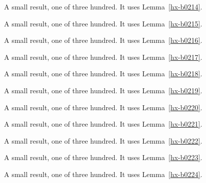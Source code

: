 \begin{lemma}[Bulk 215]\label{hx-b0215}
A small result, one of three hundred. It uses Lemma~\ref{hx-b0214}.
\end{lemma}

\begin{lemma}[Bulk 216]\label{hx-b0216}
A small result, one of three hundred. It uses Lemma~\ref{hx-b0215}.
\end{lemma}

\begin{lemma}[Bulk 217]\label{hx-b0217}
A small result, one of three hundred. It uses Lemma~\ref{hx-b0216}.
\end{lemma}

\begin{lemma}[Bulk 218]\label{hx-b0218}
A small result, one of three hundred. It uses Lemma~\ref{hx-b0217}.
\end{lemma}

\begin{lemma}[Bulk 219]\label{hx-b0219}
A small result, one of three hundred. It uses Lemma~\ref{hx-b0218}.
\end{lemma}

\begin{lemma}[Bulk 220]\label{hx-b0220}
A small result, one of three hundred. It uses Lemma~\ref{hx-b0219}.
\end{lemma}

\begin{lemma}[Bulk 221]\label{hx-b0221}
A small result, one of three hundred. It uses Lemma~\ref{hx-b0220}.
\end{lemma}

\begin{lemma}[Bulk 222]\label{hx-b0222}
A small result, one of three hundred. It uses Lemma~\ref{hx-b0221}.
\end{lemma}

\begin{lemma}[Bulk 223]\label{hx-b0223}
A small result, one of three hundred. It uses Lemma~\ref{hx-b0222}.
\end{lemma}

\begin{lemma}[Bulk 224]\label{hx-b0224}
A small result, one of three hundred. It uses Lemma~\ref{hx-b0223}.
\end{lemma}

\begin{lemma}[Bulk 225]\label{hx-b0225}
A small result, one of three hundred. It uses Lemma~\ref{hx-b0224}.
\end{lemma}

